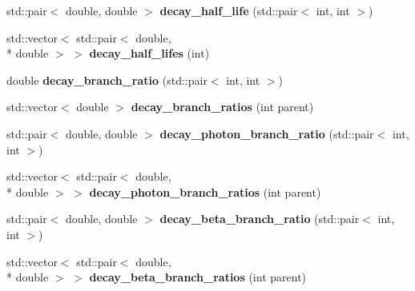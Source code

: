 \begin{DoxyCompactItemize}
\item 
\hypertarget{namespacepyne_acfa39b50f6a8d82e8a651df1f2802c91}{std\+::pair$<$ double, double $>$ {\bfseries decay\+\_\+half\+\_\+life} (std\+::pair$<$ int, int $>$)}\label{namespacepyne_acfa39b50f6a8d82e8a651df1f2802c91}

\item 
\hypertarget{namespacepyne_a107db9126709d0f3ccf56f198d4270a5}{std\+::vector$<$ std\+::pair$<$ double, \\*
double $>$ $>$ {\bfseries decay\+\_\+half\+\_\+lifes} (int)}\label{namespacepyne_a107db9126709d0f3ccf56f198d4270a5}

\item 
\hypertarget{namespacepyne_a9664752687deed520d438837982e7222}{double {\bfseries decay\+\_\+branch\+\_\+ratio} (std\+::pair$<$ int, int $>$)}\label{namespacepyne_a9664752687deed520d438837982e7222}

\item 
\hypertarget{namespacepyne_a14334fe7674faca75d40f5864b5fb1c1}{std\+::vector$<$ double $>$ {\bfseries decay\+\_\+branch\+\_\+ratios} (int parent)}\label{namespacepyne_a14334fe7674faca75d40f5864b5fb1c1}

\item 
\hypertarget{namespacepyne_a52dacedebd3759972e8eaba92415d6a6}{std\+::pair$<$ double, double $>$ {\bfseries decay\+\_\+photon\+\_\+branch\+\_\+ratio} (std\+::pair$<$ int, int $>$)}\label{namespacepyne_a52dacedebd3759972e8eaba92415d6a6}

\item 
\hypertarget{namespacepyne_a56c577e234113f0b8068882018072888}{std\+::vector$<$ std\+::pair$<$ double, \\*
double $>$ $>$ {\bfseries decay\+\_\+photon\+\_\+branch\+\_\+ratios} (int parent)}\label{namespacepyne_a56c577e234113f0b8068882018072888}

\item 
\hypertarget{namespacepyne_a2da9236f7356b5fd67adc01777af6769}{std\+::pair$<$ double, double $>$ {\bfseries decay\+\_\+beta\+\_\+branch\+\_\+ratio} (std\+::pair$<$ int, int $>$)}\label{namespacepyne_a2da9236f7356b5fd67adc01777af6769}

\item 
\hypertarget{namespacepyne_aef5ed08c65dbe62f9da6f7206772f7e5}{std\+::vector$<$ std\+::pair$<$ double, \\*
double $>$ $>$ {\bfseries decay\+\_\+beta\+\_\+branch\+\_\+ratios} (int parent)}\label{namespacepyne_aef5ed08c65dbe62f9da6f7206772f7e5}


\end{DoxyCompactItemize}
